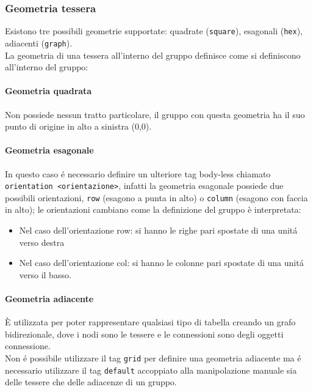 \subsubsection{Geometria tessera}
Esistono tre possibili geometrie supportate: quadrate (\lstinline|square|), 
esagonali (\lstinline|hex|), adiacenti (\lstinline|graph|). \\
La geometria di una tessera all'interno del gruppo definisce come si definiscono all'interno del gruppo:

\paragraph{Geometria quadrata}
Non possiede nessun tratto particolare, 
il gruppo con questa geometria ha il suo punto di origine in alto a sinistra (0,0). 

\paragraph{Geometria esagonale}
In questo caso é necessario definire un ulteriore tag body-less chiamato \lstinline|orientation <orientazione>|,
infatti la geometria esagonale possiede due possibili orientazioni, \lstinline|row| (esagono a punta in alto) 
o \lstinline|column| (esagono con faccia in alto); 
le orientazioni cambiano come la definizione del gruppo è interpretata:
\begin{itemize}
    \item Nel caso dell'orientazione row: si hanno le righe pari spostate di una unitá verso destra
    \item Nel caso dell'orientazione col: si hanno le colonne pari spostate di una unitá verso il basso.
\end{itemize}

\begin{figure}[ht]
\begin{center}
\end{center}    
\end{figure}

\paragraph{Geometria adiacente}
È utilizzata per poter rappresentare qualsiasi tipo di tabella creando un grafo bidirezionale, dove
i nodi sono le tessere e le connessioni sono degli oggetti connessione. \\ 
Non é possibile utilizzare il tag \lstinline|grid| per definire una geometria adiacente ma é 
necessario utilizzare il tag \lstinline|default| accoppiato
alla manipolazione manuale sia delle tessere che delle adiacenze di un gruppo.

